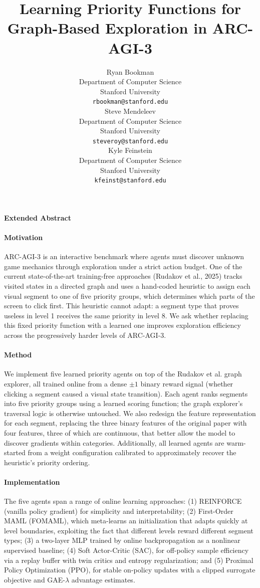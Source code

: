 \documentclass{article}
\title{Learning Priority Functions for Graph-Based Exploration in ARC-AGI-3}
\author{%
  Ryan Bookman \\
  Department of Computer Science\\
  Stanford University\\
  \texttt{rbookman@stanford.edu} \\
  \And
  Steve Mendeleev \\
  Department of Computer Science\\
  Stanford University\\
  \texttt{steveroy@stanford.edu} \\
  \And
  Kyle Feinstein \\
  Department of Computer Science\\
  Stanford University\\
  \texttt{kfeinst@stanford.edu} \\
}
\begin{document}
\begin{titlepage}
\begin{center}
\Large\textbf{Extended Abstract}
\end{center}
\vspace{10pt}


\paragraph{Motivation} ARC-AGI-3 is an interactive benchmark where agents must discover unknown game mechanics through exploration under a strict action budget. One of the current state-of-the-art training-free approaches (Rudakov et al., 2025) tracks visited states in a directed graph and uses a hand-coded heuristic to assign each visual segment to one of five priority groups, which determines which parts of the screen to click first. This heuristic cannot adapt: a segment type that proves useless in level 1 receives the same priority in level 8. We ask whether replacing this fixed priority function with a learned one improves exploration efficiency across the progressively harder levels of ARC-AGI-3.

\paragraph{Method} We implement five learned priority agents on top of the Rudakov et al. graph explorer, all trained online from a dense $\pm 1$ binary reward signal (whether clicking a segment caused a visual state transition). Each agent ranks segments into five priority groups using a learned scoring function; the graph explorer's traversal logic is otherwise untouched. We also redesign the feature representation for each segment, replacing the three binary features of the original paper with four features, three of which are continuous, that better allow the model to discover gradients within categories. Additionally, all learned agents are warm-started from a weight configuration calibrated to approximately recover the heuristic's priority ordering.

\paragraph{Implementation} The five agents span a range of online learning approaches: (1) REINFORCE (vanilla policy gradient) for simplicity and interpretability; (2) First-Order MAML (FOMAML), which meta-learns an initialization that adapts quickly at level boundaries, exploiting the fact that different levels reward different segment types; (3) a two-layer MLP trained by online backpropagation as a nonlinear supervised baseline; (4) Soft Actor-Critic (SAC), for off-policy sample efficiency via a replay buffer with twin critics and entropy regularization; and (5) Proximal Policy Optimization (PPO), for stable on-policy updates with a clipped surrogate objective and GAE-$\lambda$ advantage estimates.


\end{titlepage}
\end{document}
